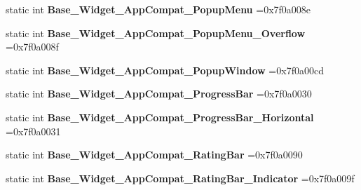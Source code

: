 \begin{DoxyCompactItemize}
\item 
\mbox{\label{classandroid_1_1support_1_1v7_1_1cardview_1_1R_1_1style_a48e3b8e922e77a5e86258ce98ff8dac7}} 
static int {\bfseries Base\+\_\+\+Widget\+\_\+\+App\+Compat\+\_\+\+Popup\+Menu} =0x7f0a008e
\item 
\mbox{\label{classandroid_1_1support_1_1v7_1_1cardview_1_1R_1_1style_ab980f7665d79dde19c6ffc3181b37736}} 
static int {\bfseries Base\+\_\+\+Widget\+\_\+\+App\+Compat\+\_\+\+Popup\+Menu\+\_\+\+Overflow} =0x7f0a008f
\item 
\mbox{\label{classandroid_1_1support_1_1v7_1_1cardview_1_1R_1_1style_a8f9a03624d4269bbad6769dd5d6da065}} 
static int {\bfseries Base\+\_\+\+Widget\+\_\+\+App\+Compat\+\_\+\+Popup\+Window} =0x7f0a00cd
\item 
\mbox{\label{classandroid_1_1support_1_1v7_1_1cardview_1_1R_1_1style_adef9de51c7652e14d073c0c761549dba}} 
static int {\bfseries Base\+\_\+\+Widget\+\_\+\+App\+Compat\+\_\+\+Progress\+Bar} =0x7f0a0030
\item 
\mbox{\label{classandroid_1_1support_1_1v7_1_1cardview_1_1R_1_1style_a4badc1de6e77383522a0bbbcdedaf3da}} 
static int {\bfseries Base\+\_\+\+Widget\+\_\+\+App\+Compat\+\_\+\+Progress\+Bar\+\_\+\+Horizontal} =0x7f0a0031
\item 
\mbox{\label{classandroid_1_1support_1_1v7_1_1cardview_1_1R_1_1style_ac3e6415696962be81c17ad1d08b6e43f}} 
static int {\bfseries Base\+\_\+\+Widget\+\_\+\+App\+Compat\+\_\+\+Rating\+Bar} =0x7f0a0090
\item 
\mbox{\label{classandroid_1_1support_1_1v7_1_1cardview_1_1R_1_1style_a2bd3ce1bea2b366ce7e3987e89b9974b}} 
static int {\bfseries Base\+\_\+\+Widget\+\_\+\+App\+Compat\+\_\+\+Rating\+Bar\+\_\+\+Indicator} =0x7f0a009f
\item 
\mbox{\label{classandroid_1_1support_1_1v7_1_1cardview_1_1R_1_1style_a0c7f01da27a39656f75e69b8b07ac24b}} 

\end{DoxyCompactItemize}
